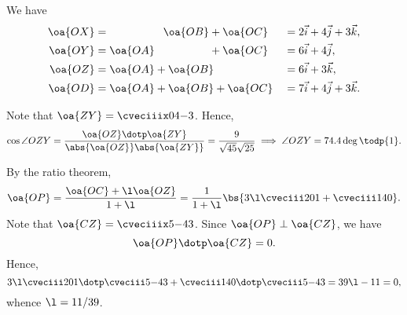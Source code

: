 \begin{solution}
    \begin{ppart}
        We have
        \begin{alignat*}{2}
            \oa{OX} &= \phantom{\oa{OA} + } \oa{OB} + \oa{OC} &&= 2\vec i + 4\vec j + 3\vec k,\\
            \oa{OY} &= \oa{OA} \phantom{+ \oa{OB}} + \oa{OC} &&= 6\vec i + 4\vec j,\\
            \oa{OZ} &= \oa{OA} + \oa{OB} \phantom{+ \oa{OC}} &&= 6\vec i + 3\vec k,\\
            \oa{OD} &= \oa{OA} + \oa{OB} + \oa{OC} &&= 7\vec i + 4\vec j + 3\vec k.
        \end{alignat*}
    \end{ppart}
    \begin{ppart}
        Note that $\oa{ZY} = \cveciiix04{-3}$. Hence, \[\cos \angle OZY = \frac{\oa{OZ} \dotp \oa{ZY}}{\abs{\oa{OZ}} \abs{\oa{ZY}}} = \frac{9}{\sqrt{45} \sqrt{25}} \implies \angle OZY = 74.4\deg \todp{1}.\]
    \end{ppart}
    \begin{ppart}
        By the ratio theorem, \[\oa{OP} = \frac{\oa{OC} + \l \oa{OZ}}{1 + \l} = \frac1{1 + \l} \bs{3\l\cveciii201 + \cveciii140}.\] Note that $\oa{CZ} = \cveciiix5{-4}{3}$. Since $\oa{OP} \perp \oa{CZ}$, we have \[\oa{OP} \dotp \oa{CZ} = 0.\] Hence, \[3\l\cveciii201 \dotp \cveciii5{-4}{3} + \cveciii140 \dotp \cveciii5{-4}{3} = 39 \l - 11= 0,\] whence $\l = 11/39$.
    \end{ppart}
\end{solution}

